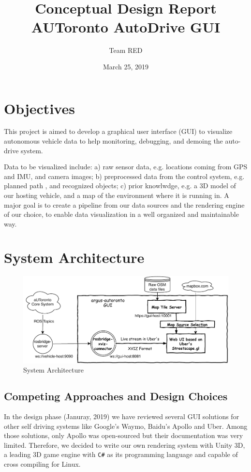 \documentclass{article}
\title{Conceptual Design Report \\
\large AUToronto AutoDrive GUI}
\author{Team RED}
\date{March 25, 2019}
\begin{document}
\maketitle

\section{Objectives}

This project is aimed to develop a graphical user interface (GUI) to visualize autonomous vehicle data to help monitoring, debugging, and demoing the auto-drive system.

Data to be visualized include: a) raw sensor data, e.g. locations coming from GPS and IMU, and camera images; b) preprocessed data from the control system, e.g. planned path , and recognized objects; c) prior knowlwdge, e.g. a 3D model of our hosting vehicle, and a map of the environment where it is running in. A major goal is to create a pipeline from our data sources and the rendering engine of our choice, to enable data visualization in a well organized and maintainable way.

\section{System Architecture}

\begin{figure}[htb]
  \centering
  \includegraphics[width=0.7\linewidth]{argus-overview.pdf}
  \caption{System Architecture \cite{github}}
  \label{fig:sys-arch}
\end{figure}

\subsection{Competing Approaches and Design Choices}

In the design phase (Januray, 2019) we have reviewed several GUI solutions for other self driving systems like Google's Waymo, Baidu's Apollo and Uber. Among those solutions, only Apollo was open-sourced but their documentation was very limited. Therefore, we decided to write our own rendering system with Unity 3D, a leading 3D game engine with \verb!C#! as its programming language and capable of cross compiling for Linux.
\end{document}
